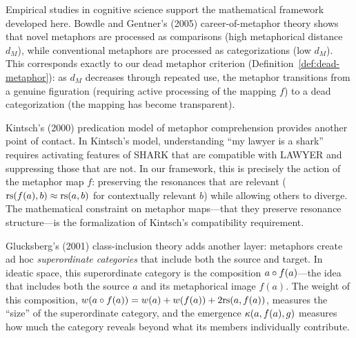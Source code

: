 \begin{remark}
Empirical studies in cognitive science support the mathematical framework
developed here.  Bowdle and Gentner's (2005) career-of-metaphor theory
shows that novel metaphors are processed as comparisons (high metaphorical
distance $d_M$), while conventional metaphors are processed as categorizations
(low $d_M$).  This corresponds exactly to our dead metaphor criterion
(Definition~\ref{def:dead-metaphor}): as $d_M$ decreases through repeated use,
the metaphor transitions from a genuine figuration (requiring active processing
of the mapping $f$) to a dead categorization (the mapping has become transparent).

Kintsch's (2000) predication model of metaphor comprehension provides another
point of contact.  In Kintsch's model, understanding ``my lawyer is a shark''
requires activating features of SHARK that are compatible with LAWYER and
suppressing those that are not.  In our framework, this is precisely the
action of the metaphor map $f$: preserving the resonances that are relevant
($\mathrm{rs}(f(a), b) \approx \mathrm{rs}(a, b)$ for contextually relevant $b$) while
allowing others to diverge.  The mathematical constraint on metaphor maps---that
they preserve resonance structure---is the formalization of Kintsch's
compatibility requirement.

Glucksberg's (2001) class-inclusion theory adds another layer: metaphors
create ad hoc \emph{superordinate categories} that include both the source
and target.  In ideatic space, this superordinate category is the
composition $a \circ f(a)$---the idea that includes both the source $a$
and its metaphorical image $f(a)$.  The weight of this composition,
$w(a \circ f(a)) = w(a) + w(f(a)) + 2\mathrm{rs}(a, f(a))$, measures the
``size'' of the superordinate category, and the emergence
$\kappa(a, f(a), g)$ measures how much the category reveals beyond what
its members individually contribute.
\end{remark}


